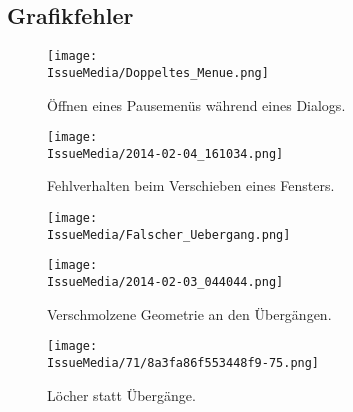 %



\clearpage


	
	
\subsection*{Grafikfehler}



%
%	
%	
%


\begin{figure}[ht]

	\centering
	\label{Anhang:Grafikfehler:Dialog_Pause}
	
	\texttt{[image: \\IssueMedia/Doppeltes\_Menue.png]}
	
	\caption{Öffnen eines Pausemenüs während eines Dialogs.}

\end{figure}

\begin{figure}[ht]

	\centering
	\label{Anhang:Grafikfehler:Fenster_Schieben}
	
	\texttt{[image: \\IssueMedia/2014-02-04\_161034.png]}
	
	\caption{Fehlverhalten beim Verschieben eines Fensters.}

\end{figure}



\clearpage



\begin{figure}[ht!]

	\centering
	\label{Anhang:Grafikfehler:Verschmolzene_Geometrie}
	
	\texttt{[image: \\IssueMedia/Falscher\_Uebergang.png]}

\end{figure}


\begin{figure}[ht!]

	\centering
	
	\texttt{[image: \\IssueMedia/2014-02-03\_044044.png]}
	
	\caption{Verschmolzene Geometrie an den Übergängen.}

\end{figure}



\clearpage



\begin{figure}[ht]

	\centering
	\label{Anhang:Grafikfehler:Loechrige_Uebergaenge}
	
	\texttt{[image: \\IssueMedia/71/8a3fa86f553448f9-75.png]}
	
	\caption{Löcher statt Übergänge.}

\end{figure}

